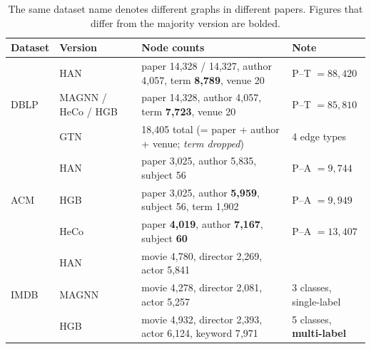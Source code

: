 \begin{table}[htbp]
\centering
\small
\caption{The same dataset name denotes different graphs in different papers. Figures that
differ from the majority version are bolded.}
\label{p2:tab:versions}
\footnotesize
\setlength{\tabcolsep}{4pt}
\begin{tabular}{@{}llp{}l@{}}
\toprule
Dataset & Version & Node counts & Note \\
\midrule
\multirow{3}{*}{DBLP}
 & HAN   & paper 14{,}328 / 14{,}327, author 4{,}057, term \textbf{8{,}789}, venue 20
         & P--T $=88{,}420$ \\
 & MAGNN / HeCo / HGB & paper 14{,}328, author 4{,}057, term \textbf{7{,}723}, venue 20
         & P--T $=85{,}810$ \\
 & GTN   & 18{,}405 total (= paper + author + venue; \emph{term dropped}) & 4 edge types \\
\midrule
\multirow{3}{*}{ACM}
 & HAN   & paper 3{,}025, author 5{,}835, subject 56 & P--A $=9{,}744$ \\
 & HGB   & paper 3{,}025, author \textbf{5{,}959}, subject 56, term 1{,}902 & P--A $=9{,}949$ \\
 & HeCo  & paper \textbf{4{,}019}, author \textbf{7{,}167}, subject \textbf{60} & P--A $=13{,}407$ \\
\midrule
\multirow{3}{*}{IMDB}
 & HAN   & movie 4{,}780, director 2{,}269, actor 5{,}841 & \\
 & MAGNN & movie 4{,}278, director 2{,}081, actor 5{,}257 & 3 classes, single-label \\
 & HGB   & movie 4{,}932, director 2{,}393, actor 6{,}124, keyword 7{,}971
         & 5 classes, \textbf{multi-label} \\
\bottomrule
\end{tabular}
\end{table}

